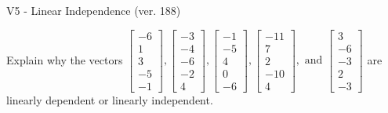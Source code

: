 \begin{exercise}
  \begin{exerciseTitle}V5 - Linear Independence (ver. 188)\end{exerciseTitle}
  \begin{exerciseStatement}
    Explain why the vectors \(\left[\begin{array}{r}
-6 \\
1 \\
3 \\
-5 \\
-1
\end{array}\right] , \left[\begin{array}{r}
-3 \\
-4 \\
-6 \\
-2 \\
4
\end{array}\right] , \left[\begin{array}{r}
-1 \\
-5 \\
4 \\
0 \\
-6
\end{array}\right] , \left[\begin{array}{r}
-11 \\
7 \\
2 \\
-10 \\
4
\end{array}\right] , \text{ and } \left[\begin{array}{r}
3 \\
-6 \\
-3 \\
2 \\
-3
\end{array}\right]\) are linearly dependent or linearly independent.	



\end{exerciseStatement}
\end{exercise}

